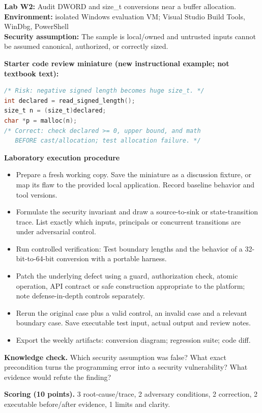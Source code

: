\documentclass[10pt,letterpaper]{article}
\begin{document}
\begin{insight}\textbf{Lab W2:} Audit DWORD and size\_t conversions near a buffer allocation.\\\textbf{Environment:} isolated Windows evaluation VM; Visual Studio Build Tools, WinDbg, PowerShell\\\textbf{Security assumption:} The sample is local/owned and untrusted inputs cannot be assumed canonical, authorized, or correctly sized.\end{insight}
\textbf{Starter code review miniature (new instructional example; not textbook text):}
\begin{lstlisting}[language=C]
/* Risk: negative signed length becomes huge size_t. */
int declared = read_signed_length();
size_t n = (size_t)declared;
char *p = malloc(n);
/* Correct: check declared >= 0, upper bound, and math
   BEFORE cast/allocation; test allocation failure. */
\end{lstlisting}
\textbf{Laboratory execution procedure}
\begin{itemize}[leftmargin=*,itemsep=2pt]
\item Prepare a fresh working copy. Save the miniature as a discussion fixture, or map its flaw to the provided local application. Record baseline behavior and tool versions.
\item Formulate the security invariant and draw a source-to-sink or state-transition trace. List exactly which inputs, principals or concurrent transitions are under adversarial control.
\item Run controlled verification: Test boundary lengths and the behavior of a 32-bit-to-64-bit conversion with a portable harness.
\item Patch the underlying defect using a guard, authorization check, atomic operation, API contract or safe construction appropriate to the platform; note defense-in-depth controls separately.
\item Rerun the original case plus a valid control, an invalid case and a relevant boundary case. Save executable test input, actual output and review notes.
\item Export the weekly artifacts: conversion diagram; regression suite; code diff.
\end{itemize}
\textbf{Knowledge check.} Which security assumption was false? What exact precondition turns the programming error into a security vulnerability? What evidence would refute the finding?

\textbf{Scoring (10 points).} 3 root-cause/trace, 2 adversary conditions, 2 correction, 2 executable before/after evidence, 1 limits and clarity.
\end{document}
